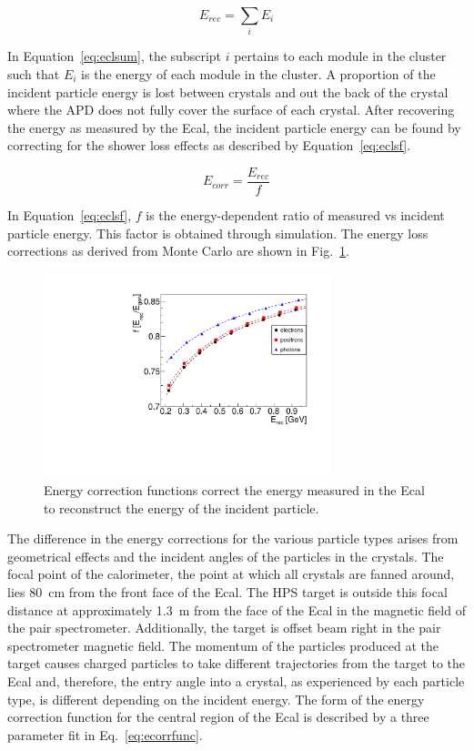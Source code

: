 \documentclass[12pt]{report}
\begin{document}
\begin{equation}
\label{eq:eclsum}
E_{rec} = \sum_i E_i    
\end{equation}

In Equation~\eqref{eq:eclsum}, the subscript $i$ pertains to each module in the cluster such that $E_i$ is the energy of each module in the cluster. A proportion of the incident particle energy is lost between crystals and out the back of the crystal where the APD does not fully cover the surface of each crystal. After recovering the energy as measured by the Ecal, the incident particle energy can be found by correcting for the shower loss effects as described by Equation~\eqref{eq:eclsf}.

\begin{equation}
\label{eq:eclsf}
E_{corr} = \dfrac{E_{rec}}{f}   
\end{equation}

In Equation~\eqref{eq:eclsf}, $f$ is the energy-dependent ratio of measured vs incident particle energy. This factor is obtained through simulation. The energy loss corrections as derived from Monte Carlo are shown in Fig.~\ref{Figure:ecorr}.

\begin{figure}[thb]
  \centering
      \includegraphics[width=0.75\textwidth]{pics/performance/energycorrection.pdf}
  \caption[Ecal energy shower correction functions from simulation]{Energy correction functions correct the energy measured in the Ecal to reconstruct the energy of the incident particle.}
  \label{Figure:ecorr}
\end{figure}

The difference in the energy corrections for the various particle types arises from geometrical effects and the incident angles of the particles in the crystals. The focal point of the calorimeter, the point at which all crystals are fanned around, lies 80~cm from the front face of the Ecal. The HPS target is outside this focal distance at approximately 1.3~m from the face of the Ecal in the magnetic field of the pair spectrometer. Additionally, the target is offset beam right in the pair spectrometer magnetic field. The momentum of the particles produced at the target causes charged particles to take different trajectories from the target to the Ecal and, therefore, the entry angle into a crystal, as experienced by each particle type, is different depending on the incident energy. The form of the energy correction function for the central region of the Ecal is described by a three parameter fit in Eq.~\eqref{eq:ecorrfunc}.
\end{document}

